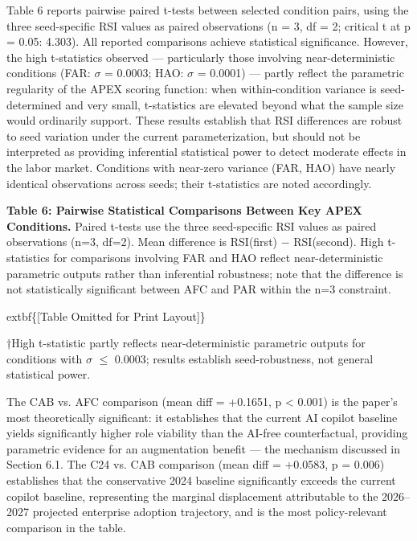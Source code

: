 \documentclass[10pt, conference]{IEEEtran}
\begin{document}
{\label{sec:statistical_comparisons}

Table 6 reports pairwise paired t-tests between selected condition pairs, using the three seed-specific RSI values as paired observations (n = 3, df = 2; critical t at p = 0.05: 4.303). All reported comparisons achieve statistical significance. However, the high t-statistics observed --- particularly those involving near-deterministic conditions (FAR: $\sigma$ = 0.0003; HAO: $\sigma$ = 0.0001) --- partly reflect the parametric regularity of the APEX scoring function: when within-condition variance is seed-determined and very small, t-statistics are elevated beyond what the sample size would ordinarily support. These results establish that RSI differences are robust to seed variation under the current parameterization, but should not be interpreted as providing inferential statistical power to detect moderate effects in the labor market. Conditions with near-zero variance (FAR, HAO) have nearly identical observations across seeds; their t-statistics are noted accordingly.

\textbf{Table 6: Pairwise Statistical Comparisons Between Key APEX Conditions.} Paired t-tests use the three seed-specific RSI values as paired observations (n=3, df=2). Mean difference is RSI(first) $-$ RSI(second). High t-statistics for comparisons involving FAR and HAO reflect near-deterministic parametric outputs rather than inferential robustness; note that the difference is not statistically significant between AFC and PAR within the n=3 constraint.

	extbf\{[Table Omitted for Print Layout]\}

†High t-statistic partly reflects near-deterministic parametric outputs for conditions with $\sigma$ $\leq$ 0.0003; results establish seed-robustness, not general statistical power.

The CAB vs. AFC comparison (mean diff = +0.1651, p < 0.001) is the paper's most theoretically significant: it establishes that the current AI copilot baseline yields significantly higher role viability than the AI-free counterfactual, providing parametric evidence for an augmentation benefit --- the mechanism discussed in Section 6.1. The C24 vs. CAB comparison (mean diff = +0.0583, p = 0.006) establishes that the conservative 2024 baseline significantly exceeds the current copilot baseline, representing the marginal displacement attributable to the 2026--2027 projected enterprise adoption trajectory, and is the most policy-relevant comparison in the table.

}
\end{document}
